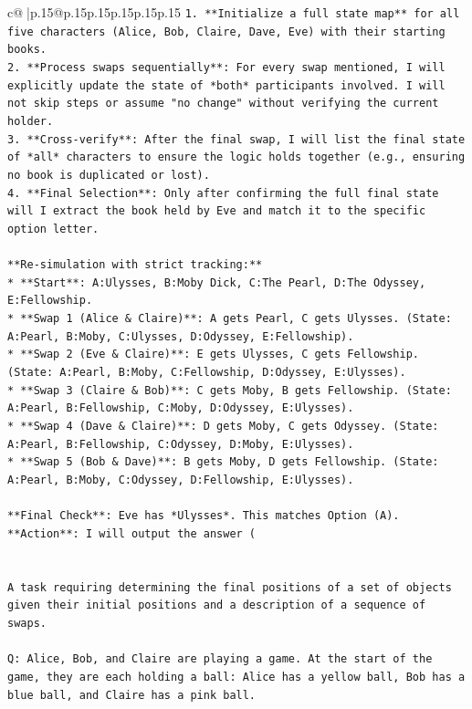 \documentclass{article}
\begin{document}
{\begin{supertabular}{c@{$\;$}|p{.15\linewidth}@{}p{.15\linewidth}p{.15\linewidth}p{.15\linewidth}p{.15\linewidth}p{.15\linewidth}}
{{{\texttt{1.  **Initialize a full state map** for all five characters (Alice, Bob, Claire, Dave, Eve) with their starting books.} \\
\texttt{2.  **Process swaps sequentially**: For every swap mentioned, I will explicitly update the state of *both* participants involved. I will not skip steps or assume "no change" without verifying the current holder.} \\
\texttt{3.  **Cross{-}verify**: After the final swap, I will list the final state of *all* characters to ensure the logic holds together (e.g., ensuring no book is duplicated or lost).} \\
\texttt{4.  **Final Selection**: Only after confirming the full final state will I extract the book held by Eve and match it to the specific option letter.} \\
\\ 
\texttt{**Re{-}simulation with strict tracking:**} \\
\texttt{*   **Start**: A:Ulysses, B:Moby Dick, C:The Pearl, D:The Odyssey, E:Fellowship.} \\
\texttt{*   **Swap 1 (Alice \& Claire)**: A gets Pearl, C gets Ulysses. (State: A:Pearl, B:Moby, C:Ulysses, D:Odyssey, E:Fellowship).} \\
\texttt{*   **Swap 2 (Eve \& Claire)**: E gets Ulysses, C gets Fellowship. (State: A:Pearl, B:Moby, C:Fellowship, D:Odyssey, E:Ulysses).} \\
\texttt{*   **Swap 3 (Claire \& Bob)**: C gets Moby, B gets Fellowship. (State: A:Pearl, B:Fellowship, C:Moby, D:Odyssey, E:Ulysses).} \\
\texttt{*   **Swap 4 (Dave \& Claire)**: D gets Moby, C gets Odyssey. (State: A:Pearl, B:Fellowship, C:Odyssey, D:Moby, E:Ulysses).} \\
\texttt{*   **Swap 5 (Bob \& Dave)**: B gets Moby, D gets Fellowship. (State: A:Pearl, B:Moby, C:Odyssey, D:Fellowship, E:Ulysses).} \\
\\ 
\texttt{**Final Check**: Eve has *Ulysses*. This matches Option (A).} \\
\texttt{**Action**: I will output the answer (} \\
\\ 
\\ 
\texttt{A task requiring determining the final positions of a set of objects given their initial positions and a description of a sequence of swaps.} \\
\\ 
\texttt{Q: Alice, Bob, and Claire are playing a game. At the start of the game, they are each holding a ball: Alice has a yellow ball, Bob has a blue ball, and Claire has a pink ball.} \\
}}}
\end{supertabular}}
\end{document}
